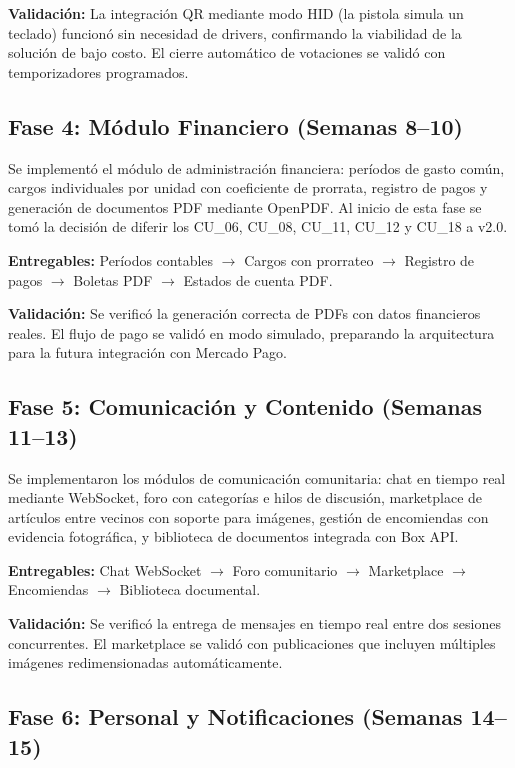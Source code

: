 \textbf{Validación:} La integración QR mediante modo HID (la pistola simula un teclado) funcionó sin necesidad de drivers, confirmando la viabilidad de la solución de bajo costo. El cierre automático de votaciones se validó con temporizadores programados.

\subsection{Fase 4: Módulo Financiero (Semanas 8--10)}

Se implementó el módulo de administración financiera: períodos de gasto común, cargos individuales por unidad con coeficiente de prorrata, registro de pagos y generación de documentos PDF mediante OpenPDF. Al inicio de esta fase se tomó la decisión de diferir los CU\_06, CU\_08, CU\_11, CU\_12 y CU\_18 a v2.0.

\textbf{Entregables:} Períodos contables $\rightarrow$ Cargos con prorrateo $\rightarrow$ Registro de pagos $\rightarrow$ Boletas PDF $\rightarrow$ Estados de cuenta PDF.

\textbf{Validación:} Se verificó la generación correcta de PDFs con datos financieros reales. El flujo de pago se validó en modo simulado, preparando la arquitectura para la futura integración con Mercado Pago.

\subsection{Fase 5: Comunicación y Contenido (Semanas 11--13)}

Se implementaron los módulos de comunicación comunitaria: chat en tiempo real mediante WebSocket, foro con categorías e hilos de discusión, marketplace de artículos entre vecinos con soporte para imágenes, gestión de encomiendas con evidencia fotográfica, y biblioteca de documentos integrada con Box API.

\textbf{Entregables:} Chat WebSocket $\rightarrow$ Foro comunitario $\rightarrow$ Marketplace $\rightarrow$ Encomiendas $\rightarrow$ Biblioteca documental.

\textbf{Validación:} Se verificó la entrega de mensajes en tiempo real entre dos sesiones concurrentes. El marketplace se validó con publicaciones que incluyen múltiples imágenes redimensionadas automáticamente.

\subsection{Fase 6: Personal y Notificaciones (Semanas 14--15)}

